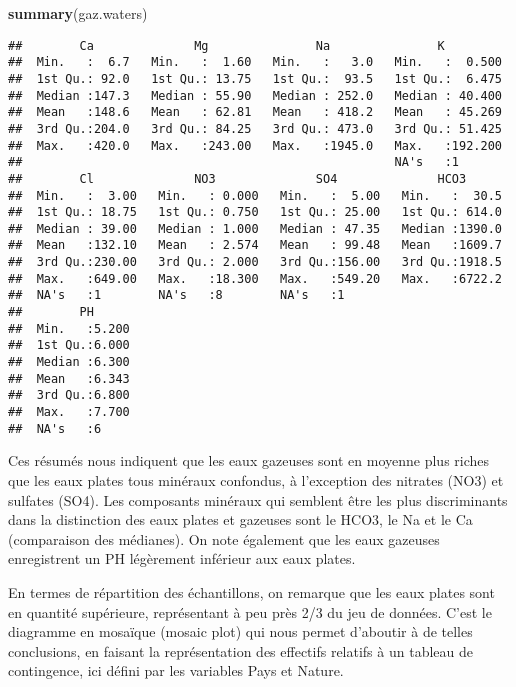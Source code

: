 \documentclass[]{article}
\newenvironment{Shaded}{\begin{snugshade}}{\end{snugshade}}
\newcommand{\KeywordTok}[1]{\textcolor[rgb]{0.13,0.29,0.53}{\textbf{#1}}}
\newcommand{\NormalTok}[1]{#1}
\begin{document}
\begin{Shaded}
\begin{Highlighting}[]
\KeywordTok{summary}\NormalTok{(gaz.waters)}
\end{Highlighting}
\end{Shaded}

\begin{verbatim}
##        Ca              Mg               Na               K          
##  Min.   :  6.7   Min.   :  1.60   Min.   :   3.0   Min.   :  0.500  
##  1st Qu.: 92.0   1st Qu.: 13.75   1st Qu.:  93.5   1st Qu.:  6.475  
##  Median :147.3   Median : 55.90   Median : 252.0   Median : 40.400  
##  Mean   :148.6   Mean   : 62.81   Mean   : 418.2   Mean   : 45.269  
##  3rd Qu.:204.0   3rd Qu.: 84.25   3rd Qu.: 473.0   3rd Qu.: 51.425  
##  Max.   :420.0   Max.   :243.00   Max.   :1945.0   Max.   :192.200  
##                                                    NA's   :1        
##        Cl              NO3              SO4              HCO3       
##  Min.   :  3.00   Min.   : 0.000   Min.   :  5.00   Min.   :  30.5  
##  1st Qu.: 18.75   1st Qu.: 0.750   1st Qu.: 25.00   1st Qu.: 614.0  
##  Median : 39.00   Median : 1.000   Median : 47.35   Median :1390.0  
##  Mean   :132.10   Mean   : 2.574   Mean   : 99.48   Mean   :1609.7  
##  3rd Qu.:230.00   3rd Qu.: 2.000   3rd Qu.:156.00   3rd Qu.:1918.5  
##  Max.   :649.00   Max.   :18.300   Max.   :549.20   Max.   :6722.2  
##  NA's   :1        NA's   :8        NA's   :1                        
##        PH       
##  Min.   :5.200  
##  1st Qu.:6.000  
##  Median :6.300  
##  Mean   :6.343  
##  3rd Qu.:6.800  
##  Max.   :7.700  
##  NA's   :6
\end{verbatim}

Ces résumés nous indiquent que les eaux gazeuses sont en moyenne plus
riches que les eaux plates tous minéraux confondus, à l'exception des
nitrates (NO3) et sulfates (SO4). Les composants minéraux qui semblent
être les plus discriminants dans la distinction des eaux plates et
gazeuses sont le HCO3, le Na et le Ca (comparaison des médianes). On
note également que les eaux gazeuses enregistrent un PH légèrement
inférieur aux eaux plates.

En termes de répartition des échantillons, on remarque que les eaux
plates sont en quantité supérieure, représentant à peu près 2/3 du jeu
de données. C'est le diagramme en mosaïque (mosaic plot) qui nous permet
d'aboutir à de telles conclusions, en faisant la représentation des
effectifs relatifs à un tableau de contingence, ici défini par les
variables Pays et Nature.
\end{document}
